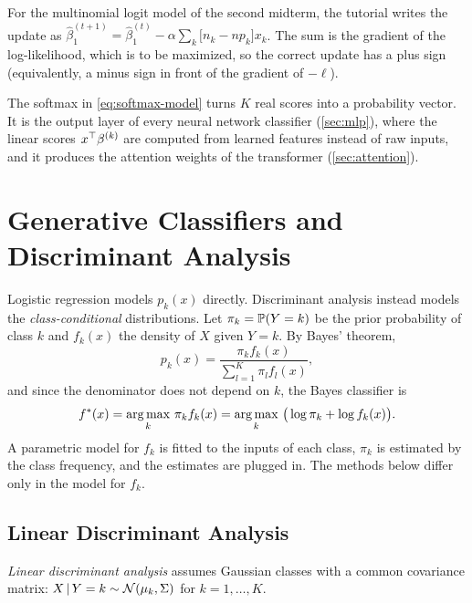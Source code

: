 \begin{remark}
For the multinomial logit model of the second midterm, the tutorial writes the update as $\hat\beta_1^{(t+1)}=\hat\beta_1^{(t)}-\alpha\sum_k\big[n_k-np_k\big]x_k$. The sum is the gradient of the log-likelihood, which is to be maximized, so the correct update has a plus sign (equivalently, a minus sign in front of the gradient of $-\ell$).
\end{remark}

\begin{remark}
The softmax in \eqref{eq:softmax-model} turns $K$ real scores into a probability vector. It is the output layer of every neural network classifier (\cref{sec:mlp}), where the linear scores $x^{\top}\beta^{(k)}$ are computed from learned features instead of raw inputs, and it produces the attention weights of the transformer (\cref{sec:attention}).
\end{remark}

\section{Generative Classifiers and Discriminant Analysis}\label{sec:generative-classifiers}

Logistic regression models $p_k(x)$ directly. Discriminant analysis instead models the \emph{class-conditional} distributions. Let $\pi_k=\mathbb{P}(Y=k)$ be the prior probability of class $k$ and $f_k(x)$ the density of $X$ given $Y=k$. By Bayes' theorem,
\begin{equation}\label{eq:da-posterior}
p_k(x)=\frac{\pi_kf_k(x)}{\sum_{l=1}^K\pi_lf_l(x)},
\end{equation}
and since the denominator does not depend on $k$, the Bayes classifier is
\[
f^*(x)=\operatorname*{arg\,max}_k\,\pi_kf_k(x)=\operatorname*{arg\,max}_k\,\big(\log\pi_k+\log f_k(x)\big).
\]
A parametric model for $f_k$ is fitted to the inputs of each class, $\pi_k$ is estimated by the class frequency, and the estimates are plugged in. The methods below differ only in the model for $f_k$.

\subsection{Linear Discriminant Analysis}\label{sec:lda}

\begin{definition}[LDA]
\emph{Linear discriminant analysis} assumes Gaussian classes with a common covariance matrix: $X\,|\, Y=k\sim\mathcal{N}(\mu_k,\Sigma)$ for $k=1,\dots,K$.
\end{definition}

